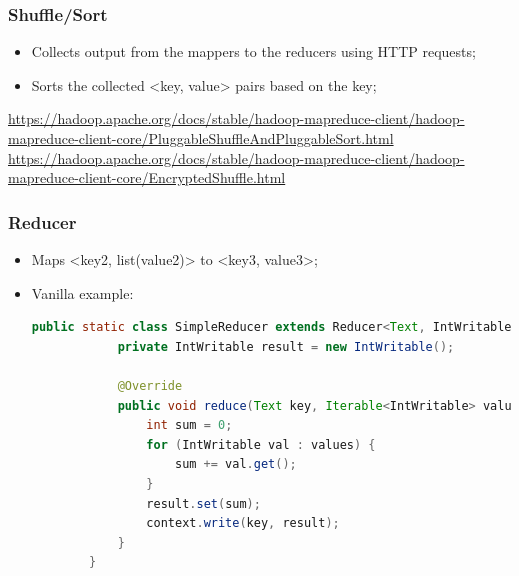 \documentclass[aspectratio=169]{beamer}
\begin{document}
\begin{frame}
	\frametitle{Shuffle/Sort}

	\begin{itemize}
		\item Collects output from the mappers to the reducers using HTTP requests;
		\item Sorts the collected <key, value> pairs based on the key;
	\end{itemize}

	\begin{center}
		{\tiny \href{https://hadoop.apache.org/docs/stable/hadoop-mapreduce-client/hadoop-mapreduce-client-core/PluggableShuffleAndPluggableSort.html}{https://hadoop.apache.org/docs/stable/hadoop-mapreduce-client/hadoop-mapreduce-client-core/PluggableShuffleAndPluggableSort.html}}
		{\tiny \href{https://hadoop.apache.org/docs/stable/hadoop-mapreduce-client/hadoop-mapreduce-client-core/EncryptedShuffle.html}{https://hadoop.apache.org/docs/stable/hadoop-mapreduce-client/hadoop-mapreduce-client-core/EncryptedShuffle.html}}
	\end{center}
\end{frame}

\begin{frame}[fragile]
	\frametitle{Reducer}

	\begin{itemize}
		\item Maps <key2, list(value2)> to <key3, value3>;
		\item Vanilla example:
		      \begin{lstlisting}[language=java,basicstyle=\tiny,columns=fullflexible]
        public static class SimpleReducer extends Reducer<Text, IntWritable, Text, IntWritable> {
            private IntWritable result = new IntWritable();

            @Override
            public void reduce(Text key, Iterable<IntWritable> values, Context context) {
                int sum = 0;
                for (IntWritable val : values) {
                    sum += val.get();
                }
                result.set(sum);
                context.write(key, result);
            }
        }
            \end{lstlisting}
	\end{itemize}
\end{frame}
\end{document}
